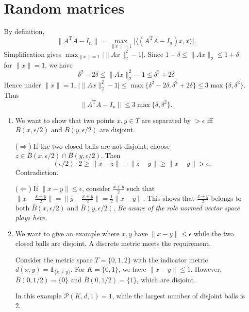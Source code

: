 \documentclass[11pt]{article}
\newcommand{\inp}[2]{\langle #1, #2 \rangle}
\newcommand{\nm}[1]{\lVert #1 \rVert}
\newcommand{\abs}[1]{\lvert #1 \rvert}
\newcommand{\ol}[1]{\overline{#1}}
\newcommand{\trp}{\mathrm T}
\renewcommand{\implies}{\Rightarrow}
\renewcommand{\impliedby}{\Leftarrow}
\newcommand{\I}[1]{\mathbf{1}_{\{#1\}}}
\theoremstyle{plain}
\theoremstyle{definition}
\theoremstyle{remark}
\theoremstyle{definition}
\newenvironment{mansol}[1]{%
  \renewcommand\themansolinner{#1}%
  \mansolinner
}{\endmansolinner}
\begin{document}
\newpage
\section{Random matrices}
\begin{mansol}{4.1.6}
By definition, \[\nm{A^\trp A - I_n} = \max_{\nm{x} = 1} \abs{\inp{(A^\trp A - I_n) x}{x}}.\]
Simplification gives $\max_{\nm{x} = 1} \big\lvert\nm{Ax}_2^2 - 1\big\rvert$. Since $1 - \delta \leq \nm{Ax}_2 \leq 1 + \delta$ for $\nm{x} = 1$, we have \[
\delta^2 - 2 \delta \leq \nm{Ax}_2^2 - 1 \leq \delta^2 + 2 \delta
\]
Hence under $\nm{x} = 1$, $\big\lvert\nm{Ax}_2^2 - 1\big\rvert \leq \max\{\delta^2 - 2\delta, \delta^2 + 2 \delta\} \leq 3 \max\{\delta, \delta^2\}$. Thus \[\nm{A^\trp A - I_n} \leq 3 \max\{\delta,\delta^2\}.\]
\end{mansol}

\begin{mansol}{4.2.5}\label{ep-sep-equiv}
\begin{enumerate}[label=(\alph*)]
\item We want to show that two points $x,y \in T$ are separated by $> \epsilon$ iff $\ol{B}(x,\epsilon/2)$ and $\ol{B}(y,\epsilon/2)$ are disjoint.

($\implies$) If the two closed balls are not disjoint, choose $z \in \ol{B}(x,\epsilon/2) \cap \ol{B}(y,\epsilon/2)$. Then \[(\epsilon/2)\cdot 2 \geq \nm{x - z} + \nm{z - y} \geq \nm{x - y} > \epsilon.\] Contradiction.

($\impliedby$) If $\nm{x-y} \leq \epsilon$, consider $\frac{x+y}{2}$ such that $\bigl\lVert x - \frac{x+y}{2} \bigr\rVert = \bigl\lVert y - \frac{x+y}{2} \bigr\rVert = \frac{1}{2}\nm{x-y}$. This shows that $\frac{x+y}{2}$ belongs to both $\ol{B}(x,\epsilon/2)$ and $\ol{B}(y,\epsilon/2)$. \emph{Be aware of the role normed vector space plays here.}

\item We want to give an example where $x,y$ have $\nm{x-y} \leq \epsilon$ while the two closed balls are disjoint. A discrete metric meets the requirement.

Consider the metric space $T = \{0,1,2\}$ with the indicator metric $d(x,y) = \I{x\neq y}$. For $K = \{0,1\}$, we have $\nm{x-y} \leq 1$. However, $\ol{B}(0,1/2) = \{0\}$ and $\ol{B}(0,1/2) = \{1\}$, which are disjoint.

In this example $\mathcal{P}(K,d,1) = 1$, while the largest number of disjoint balls is 2.
\end{enumerate}
\end{mansol}
\end{document}
